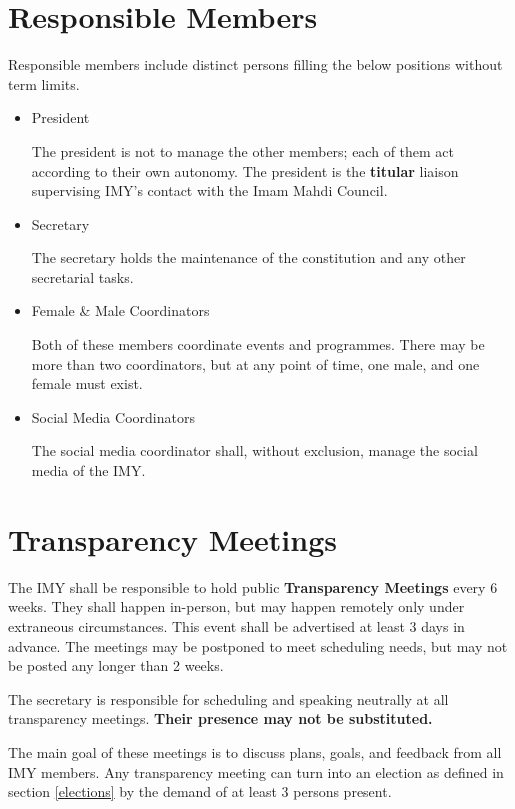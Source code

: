 \documentclass{article}
\begin{document}
\section{Responsible Members}
\label{responsible_members}
Responsible members include distinct persons filling the below positions without term limits.
\begin{itemize}
      \item President

            The president is not to manage the other members; each of them act according to their own autonomy.
            The president is the \textbf{titular} liaison supervising IMY's contact with the Imam Mahdi Council.
      \item Secretary

            The secretary holds the maintenance of the constitution and any other secretarial tasks.
      \item Female \& Male Coordinators

            Both of these members coordinate events and programmes.
            There may be more than two coordinators, but at any point of time, one male, and one female must exist.

      \item Social Media Coordinators

            The social media coordinator shall, without exclusion, manage the social media of the IMY.
\end{itemize}

\section{Transparency Meetings}
\label{transparency_meetings}

The IMY shall be responsible to hold public \textbf{Transparency Meetings} every
6
weeks.
They shall happen in-person, but may happen remotely only under extraneous circumstances.
This event shall be advertised at least
3
days in advance.
The meetings may be postponed to meet scheduling needs, but may not be posted any longer than
2
weeks.

The secretary is responsible for scheduling and speaking neutrally at all transparency meetings.
\textbf{Their presence may not be substituted.}

The main goal of these meetings is to discuss plans, goals, and feedback from all IMY members.
Any transparency meeting can turn into an election as defined in section \ref{elections} by the demand of at least
3
persons present.
\end{document}
